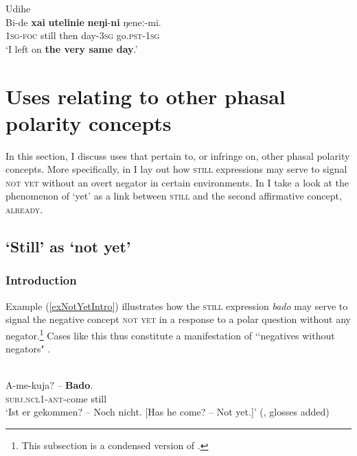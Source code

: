 \begin{exe}
	\ex Udihe \label{exSameUdiheDay}\\
	\gll Bi-de \textbf{xai} \textbf{utelinie} \textbf{neŋi}-\textbf{ni} ŋeneː-mi.\\
	1\textsc{sg}-\textsc{foc} still then day-3\textsc{sg} go.\textsc{pst}-1\textsc{sg}\\
	\glt \lq I left on \textbf{the very same day}.\rq{ }\parencite[440–441]{NikolaevaTolskaya2001}
\end{exe}

\section{Uses relating to other phasal polarity concepts}
\label{sectionOtherPhPConcepts}
In this section, I discuss uses that pertain to, or infringe on, other phasal polarity concepts. More specifically, in  I lay out how \textsc{still} expressions may serve to signal \textsc{not yet} without an overt negator in certain environments. In  I take a look at the phenomenon of  \lq yet\rq{ }as a link between \textsc{still} and the second affirmative concept, \textsc{already}.
\subsection{\lq{}Still\rq{ }as \lq{}not yet\rq}\label{sectionNotYet}
\subsubsection{Introduction}
Example (\ref{exNotYetIntro}) illustrates how the  \textsc{still} expression \textit{bado} may serve to signal the negative concept \textsc{not yet} in a response to a polar question without any negator.\footnote{This subsection is a condensed version of \textcite{PersohnNotYet}.} Cases like this thus constitute a manifestation of \lq\lq negatives without negators" \parencite{Miestamo2010}.

\begin{exe}
	\ex {}\label{exNotYetIntro}\\
	\gll A-me-kuja? – \textbf{Bado}.\\
	\textsc{subj}.\textsc{ncl}1-\textsc{ant}-come {} still\\
	\glt \lq Ist er gekommen? -- Noch nicht. [Has he come? -- Not yet.]\rq{} (\cite[15]{Schadeberg1990}, glosses added)
\end{exe}

